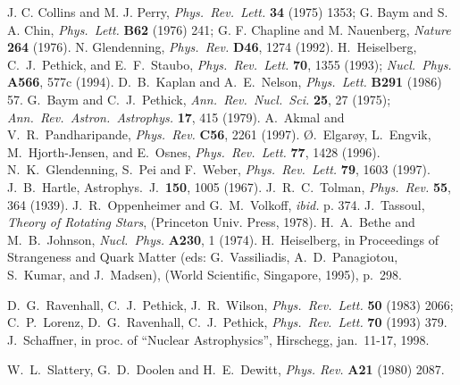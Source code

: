 \begin{multicols}{2}
\begin{references}
  J. C. Collins and M. J. Perry, {\it Phys.\ Rev.\ Lett.} {\bf 34} (1975)
 1353;
  G. Baym and S. A. Chin, {\it Phys.\ Lett.} {\bf B62} (1976) 241;
  G. F. Chapline and M. Nauenberg,
  {\it Nature} {\bf 264} (1976).
 N. Glendenning, {\it Phys.\ Rev.} {\bf D46}, 1274 (1992).
 H.\ Heiselberg, C.\ J.\ Pethick, and E.\ F.\ Staubo, 
              {\it Phys.\ Rev.\ Lett.} {\bf 70}, 1355 (1993);
              {\it Nucl.\ Phys.} {\bf A566}, 577c (1994).
 D.\ B.\  Kaplan and A.\ E.\ Nelson, {\it Phys.\ Lett.} 
             {\bf B291} (1986) 57.
 G.\ Baym and C.\ J.\ Pethick, {\it Ann.\ Rev.\ Nucl.\ Sci.}
       {\bf 25},
27 (1975); {\it Ann.\ Rev.\ Astron.\ Astrophys.} {\bf 17}, 415 (1979).
 A.\ Akmal and V.\ R.\ Pandharipande, {\it Phys.\ Rev.} 
                {\bf C56}, 2261 (1997).
 \O.\ Elgar\o y, L.\ Engvik, M.\ Hjorth-Jensen, and 
                   E.\ Osnes, {\it Phys.\ Rev.\ Lett.} {\bf 77}, 1428 (1996).
 N.\ K.\ Glendenning, S.\ Pei and F.\ Weber, 
              {\it Phys.\ Rev.\ Lett.} {\bf 79}, 1603 (1997).
 J.\ B.\ Hartle, Astrophys.\ J.\ {\bf 150}, 1005 (1967).
 J.\ R.\ C.\ Tolman, {\it Phys.\ Rev.} {\bf 55}, 364 (1939).
              J.\ R.\ Oppenheimer and G.\ M.\ Volkoff, {\it ibid.} p. 374.
 J.\ Tassoul, {\em Theory of Rotating Stars}, (Princeton Univ.
                  Press, 1978).
 H.\ A.\ Bethe and M.\ B.\ Johnson, 
             {\it Nucl.\ Phys.} {\bf A230}, 1 (1974).
 H.\ Heiselberg, in
      Proceedings of  Strangeness and Quark Matter (eds: G.\ Vassiliadis,
      A.\ D.\ Panagiotou, S.\ Kumar, and J.\ Madsen), (World Scientific,
      Singapore,  1995), p.\ 298. 

 D.\ G.\ Ravenhall, C.\ J.\ Pethick, J.\ R.\ Wilson,
         {\it Phys.\ Rev.\ Lett.} {\bf 50} (1983) 2066; C.\ P.\ Lorenz,
   D.\ G.\  Ravenhall, C.\ J.\ Pethick, 
   {\it Phys.\ Rev.\ Lett.} {\bf 70} (1993) 379.
 J.\ Schaffner, in proc. of ``Nuclear Astrophysics'',
                    Hirschegg, jan.\ 11-17, 1998.
 

 W.\ L.\ Slattery, G.\ D.\  Doolen and H.\ E.\ Dewitt, 
              {\it Phys. Rev.} {\bf A21} (1980) 2087.

\end{references} 

\end{multicols}

